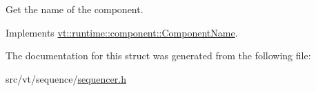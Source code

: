 Get the name of the component. 



Implements \hyperlink{structvt_1_1runtime_1_1component_1_1_component_name_a33c06229bb605a2b2ceff68830d6d773}{vt\+::runtime\+::component\+::\+Component\+Name}.



The documentation for this struct was generated from the following file\+:\begin{DoxyCompactItemize}
\item 
src/vt/sequence/\hyperlink{sequencer_8h}{sequencer.\+h}\end{DoxyCompactItemize}
